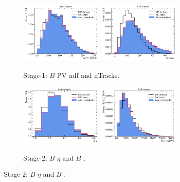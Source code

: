 \begin{figure}[htb]
    \begin{subfigure}{\textwidth}
        \centering
        \includegraphics[width=0.45\textwidth]{./figs-mc-correction/reweighting-JpsiK/reweight-JpsiK/b_ownpv_ndof.pdf}
        \hspace{1em}
        \includegraphics[width=0.45\textwidth]{./figs-mc-correction/reweighting-JpsiK/reweight-JpsiK/ntracks.pdf}
        \caption{Stage-1: $B$ PV ndf and nTracks.}
        \label{fig:rwt-JpsiK:stage1}
    \end{subfigure}

    \begin{subfigure}{\textwidth}
        \centering
        \includegraphics[width=0.45\textwidth]{./figs-mc-correction/reweighting-JpsiK/reweight-JpsiK/b_eta.pdf}
        \hspace{1em}
        \includegraphics[width=0.45\textwidth]{./figs-mc-correction/reweighting-JpsiK/reweight-JpsiK/b_pt.pdf}
        \caption{Stage-2: $B$ $\eta$ and $B$ \pt.}
        \label{fig:rwt-JpsiK:stage2}
    \end{subfigure}


\end{figure}

